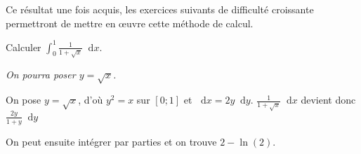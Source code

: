 \documentclass[11pt,a4paper,french]{article}
\newcommand{\diff}{\mathop{}\mathopen{}\mathrm{d}}
\theoremstyle{break}
\theoremstyle{plain}
\theoremstyle{nonumberplain}
\theoremstyle{nonumberbreak}
\begin{document}
Ce résultat une fois acquis, les exercices suivants de difficulté
croissante permettront de mettre en œuvre cette méthode de calcul.

\begin{question}
  Calculer $\int_0^1 \frac1{1+\sqrt{x}}\diff x$.

  \emph{On pourra poser $y = \sqrt{x}$.}
\end{question}
\begin{solution}
  On pose $y = \sqrt{x}$, d'où $y^2 = x$ sur $[0;1]$ et $\diff x = 2 y
  \diff y$. $\frac1{1+\sqrt{x}}\diff x$ devient donc $\frac{2y}{1+y}
  \diff y$
  
  On peut ensuite intégrer par parties et on trouve $2 - \ln(2)$.
\end{solution}

\pagebreak
\end{document}
